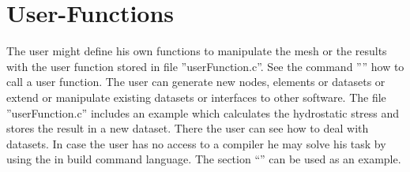 \documentclass{article}
\begin{document}
 \section{\label{User-Functions}User-Functions}
The user might define his own functions to manipulate the mesh or the results with the user function stored in file ''userFunction.c''. See the command '''' how to call a user function. The user can generate new nodes, elements or datasets or extend or manipulate existing datasets or interfaces to other software. The file ''userFunction.c'' includes an example which calculates the hydrostatic stress and stores the result in a new dataset. There the user can see how to deal with datasets. In case the user has no access to a compiler he may solve his task by using the in build command language. The section ``'' can be used as an example.
\end{document}
